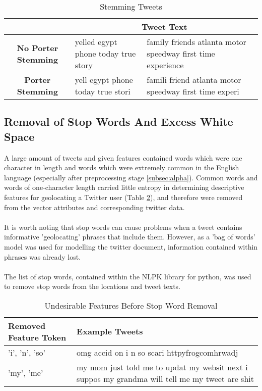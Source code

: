 \documentclass[11pt]{article}
\begin{document}
\begin{table} [ht]
\caption{Stemming Tweets}
\begin{center}
	\begin{tabular}{| c | p{6cm} | p{6cm} |}
	\hline
	  & \multicolumn{2}{|c|}{\textbf{Tweet Text}}\\
	\hline
	\textbf{No Porter Stemming} & yelled egypt phone today true story & family friends atlanta motor speedway first time experience\\
	\hline
	\textbf{Porter Stemming}  & yell egypt phone today true stori & famili friend atlanta motor speedway first time experi \\
	\hline
	\end{tabular}
\end{center}
\label{table:stem-tweet}
\end{table}

\subsection{Removal of Stop Words And Excess White Space}
A large amount of tweets and given features contained words which were one character in length and words which were extremely common in the English language (especially after preprocessing stage \ref{subsec:alpha}). Common words and words of one-character length carried little entropy\citep{ra-stop} in determining descriptive features for geolocating a Twitter user (Table \ref{table:stop-words}), and therefore were removed from the vector attributes and corresponding twitter data.\\\\
It is worth noting that stop words can cause problems when a tweet contains informative 'geolocating' phrases that include them. However, as a 'bag of words' model was used for modelling the twitter document, information contained within phrases was already lost. \\\\
The list of stop words, contained within the NLPK library for python, was used to remove stop words from the locations and tweet texts.

\begin{table}[h]
	\centering
	\caption{Undesirable Features Before Stop Word Removal}
	\begin{tabular}{| l | p{12cm} |}
	\hline
	 \textbf{Removed Feature Token} & \textbf{Example Tweets}\\
	\hline
	'i', 'n', 'so' & omg accid on i n so scari httpyfrogcomhrwadj \\
	\hline
	'my', 'me'  & my mom just told me to updat my websit next i suppos my grandma will tell me my tweet are shit\\
	\hline
	\end{tabular}
	\label{table:stop-words}
\end{table}
\end{document}
